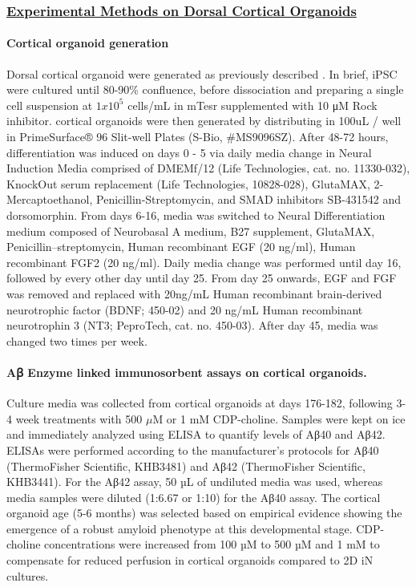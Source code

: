 \subsubsection{\underline{Experimental Methods on Dorsal Cortical Organoids}} 

\paragraph{Cortical organoid generation}
Dorsal cortical organoid were generated as previously described \cite{Sloan2018-ja}. In brief, iPSC were cultured until 80-90\% confluence, before dissociation and preparing a single cell suspension at $1 x 10^5$ cells/mL in mTesr supplemented with 10 μM Rock inhibitor. cortical organoids were then generated by distributing in 100uL / well in PrimeSurface® 96 Slit-well Plates (S-Bio, #MS9096SZ). After 48-72 hours, differentiation was induced on days 0 - 5 via daily media change in Neural Induction Media comprised of DMEMf/12 (Life Technologies, cat. no. 11330-032), KnockOut serum replacement (Life Technologies, 10828-028), GlutaMAX, 2-Mercaptoethanol, Penicillin-Streptomycin, and SMAD inhibitors SB-431542 and dorsomorphin. From days 6-16, media was switched to Neural Differentiation medium composed of Neurobasal A medium, B27 supplement, GlutaMAX, Penicillin–streptomycin, Human recombinant EGF (20 ng/ml), Human recombinant FGF2 (20 ng/ml). Daily media change was performed until day 16, followed by every other day until day 25. From day 25 onwards, EGF and FGF was removed and replaced with 20ng/mL Human recombinant brain-derived neurotrophic factor (BDNF; 450-02) and 20 ng/mL Human recombinant neurotrophin 3 (NT3; PeproTech, cat. no. 450-03). After day 45, media was changed two times per week. 

\paragraph{Aꞵ Enzyme linked immunosorbent assays on cortical organoids.}
Culture media was collected from cortical organoids at days 176-182, following 3-4 week treatments with 500 $\mu$M or 1 mM CDP-choline. Samples were kept on ice and immediately analyzed using ELISA to quantify levels of Aβ40 and Aβ42. ELISAs were performed according to the manufacturer’s protocols for Aβ40 (ThermoFisher Scientific, KHB3481) and Aβ42 (ThermoFisher Scientific, KHB3441). For the Aβ42 assay, 50 µL of undiluted media was used, whereas media samples were diluted (1:6.67 or 1:10) for the Aβ40 assay. The cortical organoid age (5-6 months) was selected based on empirical evidence showing the emergence of a robust amyloid phenotype at this developmental stage. CDP-choline concentrations were increased from 100 µM to 500 µM and 1 mM to compensate for reduced perfusion in cortical organoids compared to 2D iN cultures.

